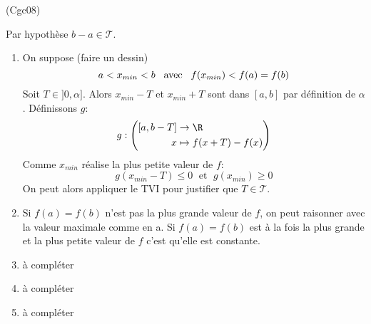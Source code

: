 \begin{tiny}(Cgc08)\end{tiny} Par hypothèse $b-a\in \mathcal{T}$.
\begin{enumerate}
  \item On suppose (faire un dessin)
\begin{displaymath}
  a < x_{min} < b \hspace{0.3cm}\text{avec} \hspace{0.3cm} f(x_{min}) < f(a)=f(b)
\end{displaymath}
Soit $T\in ]0,\alpha]$. Alors $x_{min}-T$ et $x_{min}+T$ sont dans $[a,b]$ par définition de $\alpha$. Définissons $g$:
\begin{displaymath}
  g:
\left( 
\begin{aligned}
  [a, b-T] &\rightarrow \R \\ x &\mapsto f(x+T) - f(x)
\end{aligned}
\right) 
\end{displaymath}
Comme $x_{min}$ réalise la plus petite valeur de $f$:
\begin{displaymath}
  g(x_{min}-T) \leq 0 \; \text{ et } \; g(x_{min}) \geq 0
\end{displaymath}
On peut alors appliquer le TVI pour justifier que $T\in \mathcal{T}$.
  \item Si $f(a)=f(b)$ n'est pas la plus grande valeur de $f$, on peut raisonner avec la valeur maximale comme en a. Si $f(a)=f(b)$ est à la fois la plus grande et la plus petite valeur de $f$ c'est qu'elle est constante.
  \item à compléter
  \item à compléter
  \item à compléter
\end{enumerate}
